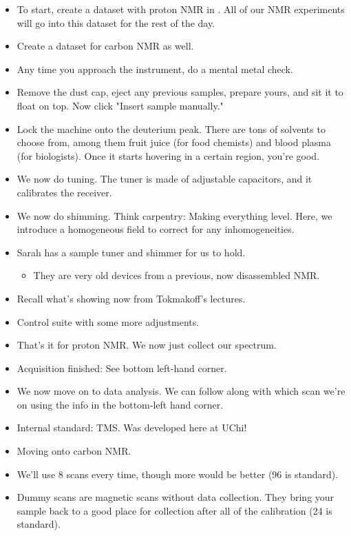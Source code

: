 \documentclass[../notes.tex]{subfiles}
\begin{document}
\begin{itemize}
    \item To start, create a dataset with proton NMR in . All of our  NMR experiments will go into this dataset for the rest of the day.
    \item Create a dataset for carbon NMR as well.
    \item Any time you approach the instrument, do a mental metal check.
    \item Remove the dust cap, eject any previous samples, prepare yours, and sit it to float on top. Now click "Insert sample manually."
    \item Lock the machine onto the  deuterium peak. There are tons of solvents to choose from, among them fruit juice (for food chemists) and blood plasma (for biologists). Once it starts hovering in a certain region, you're good.
    \item We now do tuning. The tuner is made of adjustable capacitors, and it calibrates the receiver.
    \item We now do shimming. Think carpentry: Making everything level. Here, we introduce a homogeneous field to correct for any inhomogeneities.
    \item Sarah has a sample tuner and shimmer for us to hold.
    \begin{itemize}
        \item They are very old devices from a previous, now disassembled NMR.
    \end{itemize}
    \item Recall what's showing now from Tokmakoff's lectures.
    \item Control suite with some more adjustments.
    \item That's it for proton NMR. We now just collect our spectrum.
    \item Acquisition finished: See bottom left-hand corner.
    \item We now move on to data analysis. We can follow along with which scan we're on using the info in the bottom-left hand corner.
    \item Internal standard: TMS. Was developed here at UChi!
    \item Moving onto carbon NMR.
    \item We'll use 8 scans every time, though more would be better (96 is standard).
    \item Dummy scans are magnetic scans without data collection. They bring your sample back to a good place for collection after all of the calibration (24 is standard).

\end{itemize}
\end{document}

